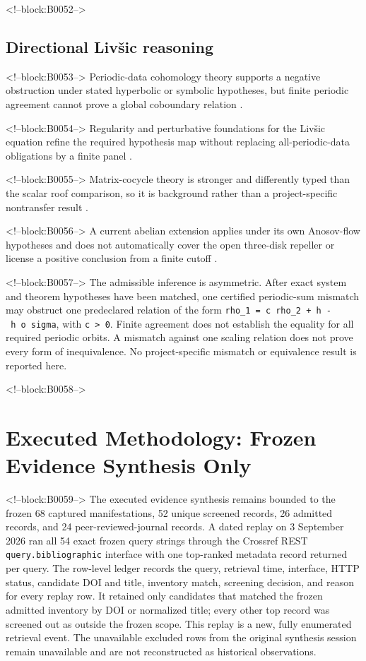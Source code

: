 \documentclass[11pt,a4paper]{article}
\begin{document}
<!--block:B0052-->
\subsection{Directional Livšic reasoning}

<!--block:B0053-->
Periodic-data cohomology theory supports a negative obstruction under stated hyperbolic or symbolic hypotheses, but finite periodic agreement cannot prove a global coboundary relation
\citep{P30-S23}.

<!--block:B0054-->
Regularity and perturbative foundations for the Livšic equation refine the required hypothesis map without replacing all-periodic-data obligations by a finite panel
\citep{P30-S24}.

<!--block:B0055-->
Matrix-cocycle theory is stronger and differently typed than the scalar roof comparison, so it is background rather than a project-specific nontransfer result
\citep{P30-S25}.

<!--block:B0056-->
A current abelian extension applies under its own Anosov-flow hypotheses and does not automatically cover the open three-disk repeller or license a positive conclusion from a finite cutoff
\citep{P30-S26}.

<!--block:B0057-->
The admissible inference is asymmetric. After exact system and theorem hypotheses have been matched, one certified periodic-sum mismatch may obstruct one predeclared relation of the form \texttt{rho\_1\ =\ c\ rho\_2\ +\ h\ -\ h\ o\ sigma}, with \texttt{c\ \textgreater{}\ 0}. Finite agreement does not establish the equality for all required periodic orbits. A mismatch against one scaling relation does not prove every form of inequivalence. No project-specific mismatch or equivalence result is reported here.

<!--block:B0058-->
\section{Executed Methodology: Frozen Evidence Synthesis Only}

<!--block:B0059-->
The executed evidence synthesis remains bounded to the frozen 68 captured
manifestations, 52 unique screened records, 26 admitted records, and 24
peer-reviewed-journal records.  A dated replay on 3 September 2026 ran all
54 exact frozen query strings through the Crossref REST
\texttt{query.bibliographic} interface with one top-ranked metadata record
returned per query.  The row-level ledger records the query, retrieval time,
interface, HTTP status, candidate DOI and title, inventory match, screening
decision, and reason for every replay row.  It retained only candidates that
matched the frozen admitted inventory by DOI or normalized title; every other
top record was screened out as outside the frozen scope.  This replay is a new,
fully enumerated retrieval event.  The unavailable excluded rows from the
original synthesis session remain unavailable and are not reconstructed as
historical observations.
\end{document}
